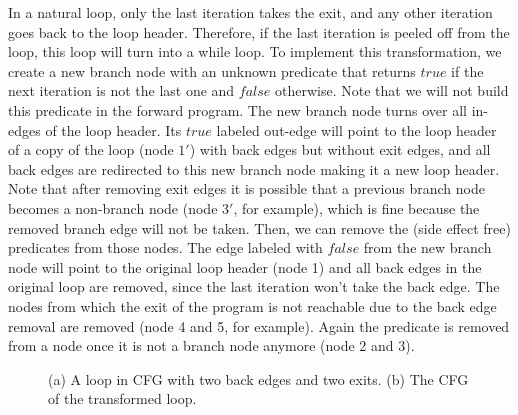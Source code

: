 In a natural loop, only the last iteration takes the exit, and any other iteration goes back to the loop header.
Therefore, if the last iteration is peeled off from the loop, this loop will turn into a while loop. 
To implement this transformation, we create a new branch node with an unknown predicate that returns $true$ if the next iteration is not the last one and $false$ otherwise.
Note that we will not build this predicate in the forward program. 
The new branch node turns over all in-edges of the loop header. 
Its $true$ labeled out-edge will point to the loop header of a copy of the loop (node $1'$) with back edges but without exit edges, and all back edges are redirected to this new branch node making it a new loop header. 
Note that after removing exit edges it is possible that a previous branch node becomes a non-branch node (node $3'$, for example), which is fine because the removed branch edge will not be taken. Then, we can remove the (side effect free) predicates from those nodes. The edge labeled with $false$ from the new branch node will point to the original loop header (node 1) and all back edges in the original loop are removed, since the last iteration won't take the back edge. The nodes from which the exit of the program is not reachable due to the back edge removal are removed (node 4 and 5, for example). Again the predicate is removed from a node once it is not a branch node anymore (node 2 and 3).

\begin{figure}%
\caption{(a) A loop in CFG with two back edges and two exits. (b) The CFG of the transformed loop.}
\label{fig:loop}
\end{figure}

